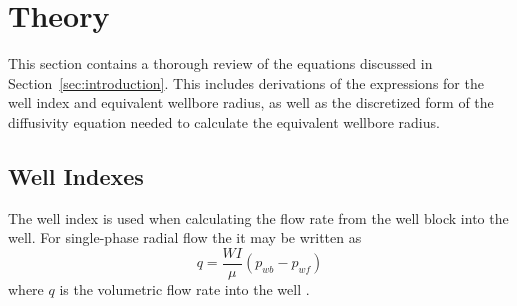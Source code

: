 
\section{Theory} %
\label{sec:theory}
This section contains a thorough review of the equations discussed in Section~\ref{sec:introduction}. This includes derivations of the expressions for the well index and equivalent wellbore radius, as well as  the discretized form of the  diffusivity equation needed to calculate the equivalent wellbore radius.

\subsection{Well Indexes} %
\label{sub:well_indices}
The well index is used when calculating the flow rate from the well block into the well. For single-phase radial flow the it may be written as
\begin{equation}
    \label{eq:peaceman-wi1}
    q = \frac{WI}{\mu} \left( p_{wb} - p_{wf} \right)
\end{equation}
where $q$ is the volumetric flow rate into the well \cite{Peaceman2003New}.

